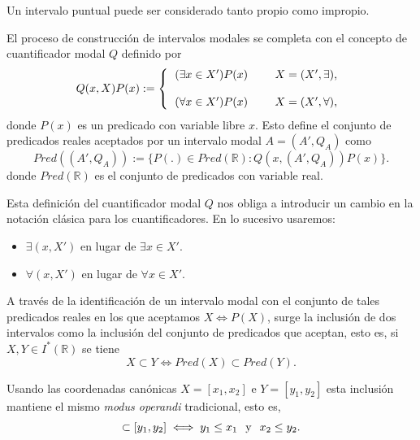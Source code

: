 \begin{remark}
Un intervalo puntual puede ser considerado tanto propio como impropio.
\end{remark}

El proceso de construcción de intervalos modales se completa con el concepto de cuantificador modal $Q$ definido por
\begin{equation}
Q(x,X)P(x) := \left\{ \begin{tabular}{l l l}
$(\exists x \in X')P(x)$ & & $X = (X', \exists)$, \\
& & \\
$(\forall x \in X')P(x)$ & & $X = (X', \forall)$,
\end{tabular}
\right.
\nonumber
\end{equation}
donde $P(x)$ es un predicado con variable libre $x$. Esto define el conjunto de predicados reales aceptados por un intervalo modal $A = (A',Q_A)$ como
\begin{equation}
Pred((A',Q_A)) := \{ P(.) \in Pred(\mathbb{R}) : Q(x,(A',Q_A))P(x) \}.
\nonumber
\end{equation}
donde $ Pred(\mathbb{R})$ es el conjunto de predicados con variable real.

Esta definición del cuantificador modal $Q$ nos obliga a introducir un cambio en la notación clásica para los cuantificadores. En lo sucesivo usaremos:
\begin{itemize}
\item $\exists(x,X')$ en lugar de $\exists x \in X'$.
\item $\forall(x,X')$ en lugar de $\forall x \in X'$.
\end{itemize}

A través de la identificación de un intervalo modal con el conjunto de tales predicados reales en los que aceptamos $X \iff P(X)$, surge la inclusión de dos intervalos como la inclusión del conjunto de predicados que aceptan, esto es, si $X, Y  \in I^*(\mathbb{R})$ se tiene
\begin{equation}
X \subset Y \iff Pred(X) \subset Pred(Y).
\nonumber
\end{equation}

Usando las coordenadas canónicas $X = [x_1,x_2]$ e $Y = [y_1,y_2]$ esta inclusión mantiene el mismo{ \em modus operandi} tradicional, esto es,
\begin{equation}
[x_1,x_2] \subset [y_1,y_2] \iff y_1 \leq x_1 \hspace{0.25cm} \text{y} \hspace{0.25cm} x_2 \leq y_2.
\nonumber
\end{equation}


